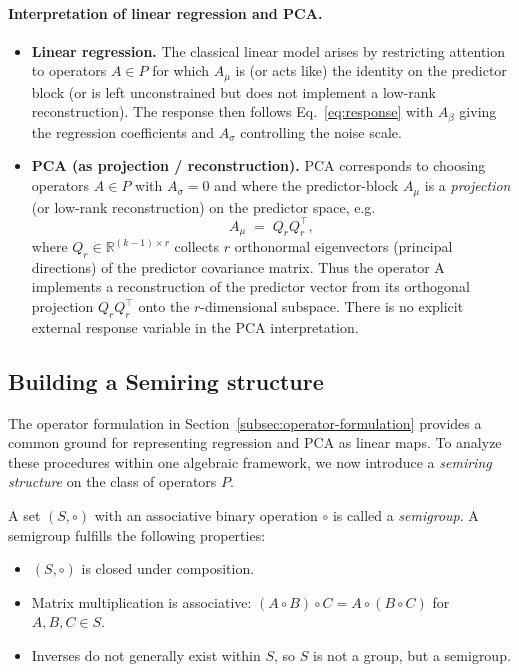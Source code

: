 \paragraph{Interpretation of linear regression and PCA.}
\begin{itemize}
  \item \textbf{Linear regression.} The classical linear model arises by restricting attention to operators \(A\in P\) for which \(A_\mu\) is (or acts like) the identity on the predictor block (or is left unconstrained but does not implement a low-rank reconstruction). The response then follows Eq.~\eqref{eq:response} with \(A_\beta\) giving the regression coefficients and \(A_\sigma\) controlling the noise scale.
  \item \textbf{PCA (as projection / reconstruction).} PCA corresponds to choosing operators \(A\in P\) with \(A_\sigma=0\) and where the predictor-block \(A_\mu\) is a \emph{projection} (or low-rank reconstruction) on the predictor space, e.g.
  \[
  A_\mu \;=\; Q_r Q_r^\top,
  \]
  where \(Q_r\in\mathbb{R}^{(k-1)\times r}\) collects \(r\) orthonormal eigenvectors (principal directions) of the predictor covariance matrix. Thus the operator A implements a reconstruction of the predictor vector from its orthogonal projection $Q_r Q_r^\top$ onto the $r$-dimensional subspace. There is no explicit external response variable in the PCA interpretation.
\end{itemize}

\subsection{Building a Semiring structure}
\label{subsec:semiring-structure}

The operator formulation in Section~\ref{subsec:operator-formulation} provides a common ground for representing regression and PCA as linear maps. To analyze these procedures within one algebraic framework, we now introduce a \emph{semiring structure} on the class of operators $P$.

\begin{defn}[Semigroup]
A set $(S, \circ)$ with an associative binary operation $\circ$ is called a \emph{semigroup}. A semigroup fulfills the following properties:

\begin{itemize}
    \item $(S, \circ)$ is closed under composition.
    \item Matrix multiplication is associative: $(A \circ B) \circ C = A \circ (B \circ C)$ for $A, B, C \in S$.
    \item Inverses do not generally exist within $S$, so $S$ is not a group, but a semigroup.
\end{itemize}
\end{defn}

